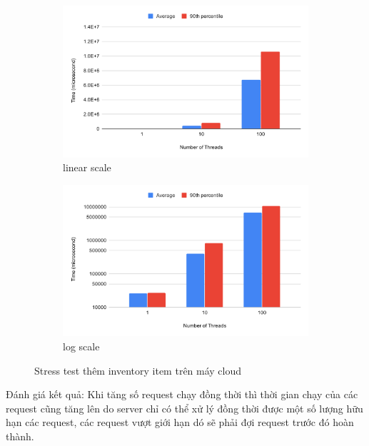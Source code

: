 \begin{figure}[H]
\centering
\begin{subfigure}{0.5\textwidth}
    \centering
    \includegraphics[width=\textwidth]
    {images/testing/stress-add-inventory-item-cloud.png}
    \caption{linear scale}
\end{subfigure}%
\begin{subfigure}{0.5\textwidth}
    \centering
    \includegraphics[width=\textwidth]
    {images/testing/stress-add-inventory-item-cloud-log.png}
    \caption{log scale}
\end{subfigure}
\caption{Stress test thêm inventory item trên máy cloud}
\end{figure}

Đánh giá kết quả: Khi tăng số request chạy đồng thời thì thời gian
chạy của các request cũng tăng lên do server chỉ có thể xử lý
đồng thời được một số lượng hữu hạn các request, các request vượt
giới hạn dó sẽ phải đợi request trước đó hoàn thành.
